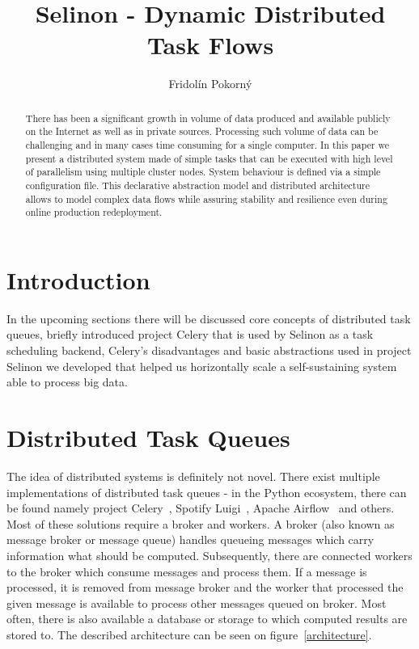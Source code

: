 \documentclass[a4paper]{llncs}
\begin{document}
%
\title{Selinon - Dynamic Distributed Task Flows}
%
%
\author{Fridol\'in Pokorn\'y}


\maketitle
\begin{abstract}
There has been a significant growth in volume of data produced and available publicly on the Internet as well as in private sources. Processing such volume of data can be challenging and in many cases time consuming for a single computer. In this paper we present a distributed system made of simple tasks that can be executed with high level of parallelism using multiple cluster nodes. System behaviour is defined via a simple configuration file. This declarative abstraction model and distributed architecture allows to model complex data flows while assuring stability and resilience even during online production redeployment.
\end{abstract}

\section{Introduction}

In the upcoming sections there will be discussed core concepts of distributed task queues, briefly introduced project Celery that is used by Selinon as a task scheduling backend, Celery's disadvantages and basic abstractions used in project Selinon we developed that helped us horizontally scale a self-sustaining system able to process big data.

\section{Distributed Task Queues} \label{section_distributed_task_queues}

The idea of distributed systems is definitely not novel. There exist multiple implementations of distributed task queues - in the Python ecosystem, there can be found namely project Celery~\cite{ref_celery}, Spotify Luigi~\cite{ref_luigi}, Apache Airflow~\cite{ref_airflow} and others. Most of these solutions require a broker and workers. A broker (also known as message broker or message queue) handles queueing messages which carry information what should be computed. Subsequently, there are connected workers to the broker which consume messages and process them. If a message is processed, it is removed from message broker and the worker that processed the given message is available to process other messages queued on broker. Most often, there is also available a database or storage to which computed results are stored to. The described architecture can be seen on figure~\ref{architecture}.
\end{document}

